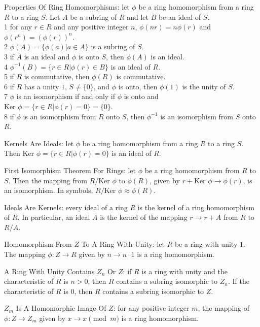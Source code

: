 Properties Of Ring Homomorphisms: let $\phi$ be a ring homomorphism from a ring $R$ to a ring $S$. Let $A$ be a subring of $R$ and let $B$ be an ideal of $S$. \\
1 for any $r \in R$ and any positive integer $n$, $\phi (nr) = n \phi (r)$ and $\phi (r^n) = (\phi (r))^n$. \\
2 $\phi (A) = \{\phi (a) | a \in A \}$ is a subring of $S$. \\
3 if $A$ is an ideal and $\phi$ is onto $S$, then $\phi (A)$ is an ideal. \\
4 $\phi^{-1} (B) = \{ r \in R | \phi (r) \in B \}$ is an ideal of $R$. \\
5 if $R$ is commutative, then $\phi (R)$ is commutative. \\
6 if $R$ has a unity $1$, $S \neq \{ 0 \}$, and $\phi$ is onto, then $\phi (1)$ is the unity of $S$. \\
7 $\phi$ is an isomorphism if and only if $\phi$ is onto and $\text{Ker }\phi = \{r \in R | \phi (r)=0 \} = \{ 0 \}$. \\
8 if $\phi$ is an isomorphism from $R$ onto $S$, then $\phi^{-1}$ is an isomorphism from $S$ onto $R$.

Kernels Are Ideals: let $\phi$ be a ring homomorphism from a ring $R$ to a ring $S$. Then $\text{Ker }\phi = \{ r \in R | \phi (r)=0 \}$ is an ideal of $R$.

First Isomorphism Theorem For Rings: let $\phi$ be a ring homomorphism from $R$ to $S$. Then the mapping from $R/\text{Ker }\phi$ to $\phi (R)$, given by $r + \text{Ker }\phi \to \phi (r)$, is an isomorphism. In symbols, $R/\text{Ker }\phi \approx \phi (R)$.

Ideals Are Kernels: every ideal of a ring $R$ is the kernel of a ring homomorphism of $R$. In particular, an ideal $A$ is the kernel of the mapping $r \to r+A$ from $R$ to $R/A$.

Homomorphism From $Z$ To A Ring With Unity: let $R$ be a ring with unity $1$. The mapping $\phi : Z \to R$ given by $n \to n \cdot 1$ is a ring homomorphism.

A Ring With Unity Contains $Z_n$ Or $Z$: if $R$ is a ring with unity and the characteristic of $R$ is $n > 0$, then $R$ contains a subring isomorphic to $Z_n$. If the characteristic of $R$ is $0$, then $R$ contains a subring isomorphic to $Z$.

$Z_m$ Is A Homomorphic Image Of $Z$: for any positive integer $m$, the mapping of $\phi : Z \to Z_m$ given by $x \to x \pmod{m}$ is a ring homomorphism.

